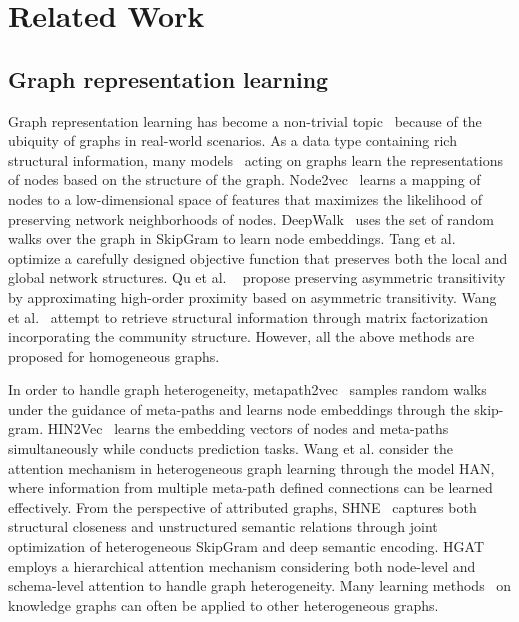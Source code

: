 \documentclass[conference]{IEEEtran}
\begin{document}
\section{Related Work}
\label{sec:relate}
	
	
	\subsection{Graph representation learning} 
	Graph representation learning has become a non-trivial topic~\cite{CWPZ18} because of the ubiquity of graphs in real-world scenarios. As a data type containing rich structural information, many models~\cite{PAS14,GL16,TQWZYM15,MPJZW16,WCWPZY17} acting on graphs learn the representations of nodes based on the structure of the graph. Node2vec~\cite{GL16} learns a mapping of nodes to a low-dimensional space of features that maximizes the likelihood of preserving network neighborhoods of nodes.
	DeepWalk~\cite{PAS14} uses the set of random walks over the graph in SkipGram to learn node embeddings. Tang et al.~\cite{TQWZYM15} optimize a carefully designed objective function that preserves both the local and global network structures.
	Qu et al. ~\cite{MPJZW16} propose preserving asymmetric transitivity by approximating high-order proximity based on asymmetric transitivity. Wang et al.~\cite{WCWPZY17} attempt to retrieve structural information through matrix factorization incorporating the community structure. However, all the above methods are proposed for homogeneous graphs.
	
	In order to handle graph heterogeneity, metapath2vec~\cite{DCS17} samples random walks under the guidance of meta-paths and learns node embeddings through the skip-gram. HIN2Vec~\cite{FCL17} learns the embedding vectors of nodes and meta-paths simultaneously while conducts prediction tasks. Wang et al. \cite{WJSWCYY19} consider the attention mechanism in heterogeneous graph learning through the model HAN, where information from multiple meta-path defined connections can be learned effectively. 
	From the perspective of attributed graphs, SHNE~\cite{ZSC19} captures both structural closeness and unstructured semantic relations through joint optimization of heterogeneous SkipGram and deep semantic encoding.
	HGAT~\cite{ren2020hgat} employs a hierarchical attention mechanism considering both node-level and schema-level attention to handle graph heterogeneity. Many learning methods~\cite{schlichtkrull2018modeling,WMWG17} on knowledge graphs can often be applied to other heterogeneous graphs.
	
\end{document}
